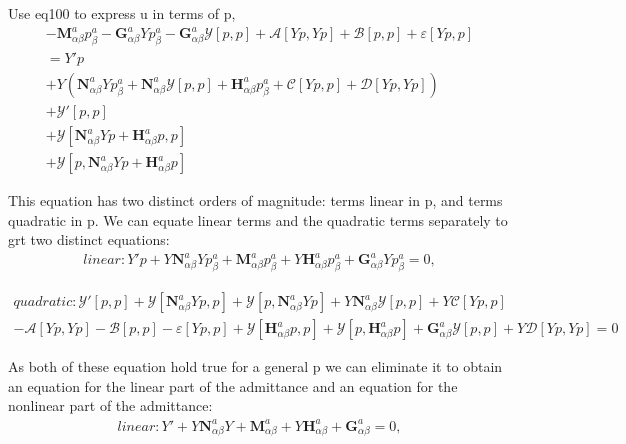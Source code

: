 \documentclass{Note}
\begin{document}
Use eq100 to express u in terms of p,
 \begin{equation}
\begin{aligned}
-\textbf{M}_{\alpha\beta}^a p_\beta^a - \textbf{G}_{\alpha\beta}^a Yp_\beta^a- \textbf{G}_{\alpha\beta}^a \mathcal{Y}[p,p]+\mathcal{A}[Yp,Yp]+\mathcal{B}[p,p]+\varepsilon[Yp,p]\\=Y'p\\
+Y(\textbf{N}_{\alpha\beta}^a Y p_\beta^a+\textbf{N}_{\alpha\beta}^a \mathcal{Y}[p,p]+\textbf{H}_{\alpha\beta}^a p_\beta^a+\mathcal{C}[Yp,p]+\mathcal{D}[Yp,Yp])\\+\mathcal{Y}'[p,p]\\
+\mathcal{Y}[\textbf{N}_{\alpha\beta}^a Y p+\textbf{H}_{\alpha\beta}^a p,p]\\
+\mathcal{Y}[p,\textbf{N}_{\alpha\beta}^a Yp+\textbf{H}_{\alpha\beta}^a p]
\end{aligned}
\end{equation}

This equation has two distinct orders of magnitude: terms linear in p, and terms quadratic in p. We can equate linear terms and the quadratic terms separately to grt two distinct equations:
 \begin{equation}
\begin{aligned}
linear:Y'p+Y\textbf{N}_{\alpha\beta}^a Y p_\beta^a+\textbf{M}_{\alpha\beta}^a p_\beta^a+Y \textbf{H}_{\alpha\beta}^a p_\beta^a+\textbf{G}_{\alpha\beta}^a Yp_\beta^a=0,
\end{aligned}
\end{equation}

\begin{equation}
\begin{aligned}
quadratic:\mathcal{Y}'[p,p]+\mathcal{Y}[\textbf{N}_{\alpha\beta}^a Yp,p]+\mathcal{Y}[p,\textbf{N}_{\alpha\beta}^a Yp]+Y\textbf{N}_{\alpha\beta}^a \mathcal{Y}[p,p]+Y\mathcal{C}[Yp,p]\\-\mathcal{A}[Yp,Yp]-\mathcal{B}[p,p]-\varepsilon[Yp,p]
+\mathcal{Y}[\textbf{H}_{\alpha\beta}^a p,p]+\mathcal{Y}[p, \textbf{H}_{\alpha\beta}^a p]+\textbf{G}_{\alpha\beta}^a \mathcal{Y}[p,p]+Y \mathcal{D}[Yp,Yp]=0
\end{aligned}
\end{equation}

As both of these equation hold true for a general p we can eliminate it to obtain an equation for the linear part of the admittance and an equation for the nonlinear part of the admittance:
 \begin{equation}
\begin{aligned}
linear:Y'+Y\textbf{N}_{\alpha\beta}^a Y +\textbf{M}_{\alpha\beta}^a +Y \textbf{H}_{\alpha\beta}^a +\textbf{G}_{\alpha\beta}^a =0,
\end{aligned}
\end{equation}
\end{document}
